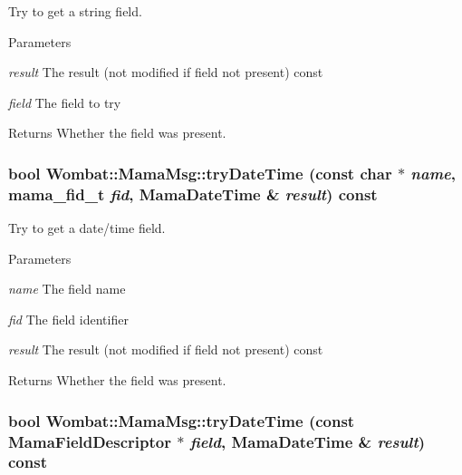 Try to get a string field. 
\begin{DoxyParams}{Parameters}
\item[{\em result}]The result (not modified if field not present) const \item[{\em field}]The field to try \end{DoxyParams}
\begin{DoxyReturn}{Returns}
Whether the field was present. 
\end{DoxyReturn}
\hypertarget{classWombat_1_1MamaMsg_a10b62ec7fcaf1f12084faa22064540e4}{
\subsubsection[{tryDateTime}]{\setlength{\rightskip}{0pt plus 5cm}bool Wombat::MamaMsg::tryDateTime (const char $\ast$ {\em name}, \/  mama\_\-fid\_\-t {\em fid}, \/  {\bf MamaDateTime} \& {\em result}) const}}
\label{classWombat_1_1MamaMsg_a10b62ec7fcaf1f12084faa22064540e4}


Try to get a date/time field. 
\begin{DoxyParams}{Parameters}
\item[{\em name}]The field name \item[{\em fid}]The field identifier \item[{\em result}]The result (not modified if field not present) const \end{DoxyParams}
\begin{DoxyReturn}{Returns}
Whether the field was present. 
\end{DoxyReturn}
\hypertarget{classWombat_1_1MamaMsg_a0143e29b236be22ded82e7b0e93f903c}{
\subsubsection[{tryDateTime}]{\setlength{\rightskip}{0pt plus 5cm}bool Wombat::MamaMsg::tryDateTime (const {\bf MamaFieldDescriptor} $\ast$ {\em field}, \/  {\bf MamaDateTime} \& {\em result}) const}}
\label{classWombat_1_1MamaMsg_a0143e29b236be22ded82e7b0e93f903c}


